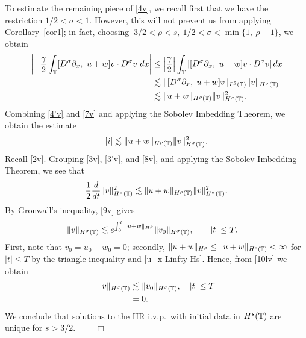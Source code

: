To estimate the remaining piece of \eqref{4v}, we recall first that we
have the restriction $1/2 < \sigma < 1$. However, this will not prevent
us from applying Corollary~\ref{cor1}; in fact, choosing $\ 3/2 < \rho
< s,  \ 1/2< \sigma <\min\{1, \ \rho -1 \}$, we obtain
\begin{equation}
\begin{split}
\left | -\frac{\gamma}{2} \int_{\mathbb{T}} [D^\sigma \partial_x, \ u+w] v
\cdot D^\sigma v \ dx \right |
& \le \left | \frac{\gamma}{2} \right| \int_{\mathbb{T}} \left |
[D^\sigma \partial_x, \ u+w] v
\cdot D^\sigma v \right | dx 
\\
& \lesssim \|[D^\sigma \partial_x, \ u+w]v\|_{L^2(\mathbb{T})}
\|v\|_{H^\sigma(\mathbb{T})} \\
& \lesssim \|u+w\|_{H^\rho(\mathbb{T})} \|v\|_{H^\sigma(\mathbb{T})}^2.
\label{7v}
\end{split}
\end{equation}
Combining \eqref{4'v} and \eqref{7v} and applying the Sobolev Imbedding
Theorem, we obtain the estimate
\begin{equation}
\begin{split}
|i| \lesssim \|u+w\|_{H^\rho(\mathbb{T})} \|v\|_{H^\sigma(\mathbb{T})}^2.
\label{8v}
\end{split}
\end{equation}
Recall \eqref{2v}. Grouping \eqref{3v}, \eqref{3'v}, and \eqref{8v}, and applying
the Sobolev Imbedding Theorem, we see that 
\begin{equation}
\begin{split}
\frac{1}{2} \frac{d}{dt}
\|v\|_{H^\sigma(\mathbb{T})}^2 \lesssim \|u+w\|_{H^\rho(\mathbb{T})}
\|v\|_{H^\sigma(\mathbb{T})}^2.
\label{9v}
\end{split}
\end{equation}
By Gronwall's inequality, \eqref{9v} gives
\begin{equation}
\label{10lv}
\begin{split}
\|v\|_{H^\sigma(\mathbb{T})}
& \lesssim e^{\int_0^t \|u+w\|_{H^{\rho}}}
\|v_0\|_{H^\sigma(\mathbb{T})}, \qquad |t| \le T.
\end{split}
\end{equation}
First, note that $v_0 = u_0 - w_0 = 0$; secondly, $\|u + w \|_{H^\rho}
\le \|u + w \|_{H^s(\mathbb{T})} < \infty$ for $|t| \le T$ by
the triangle inequality and \eqref{u_x-Linfty-Hs}. Hence, from
\eqref{10lv} we obtain
\begin{equation*}
\begin{split}
\|v\|_{H^\sigma(\mathbb{T})}
& \lesssim \|v_0\|_{H^\sigma(\mathbb{T})}, \quad |t| \le T	
\\
& = 0.
\end{split}
\end{equation*}
We conclude that solutions to the HR i.v.p.\ with initial data in
$H^s(\mathbb{T})$ are unique for $s > 3/2$.  $\qquad
\Box$
%
%
%
%
